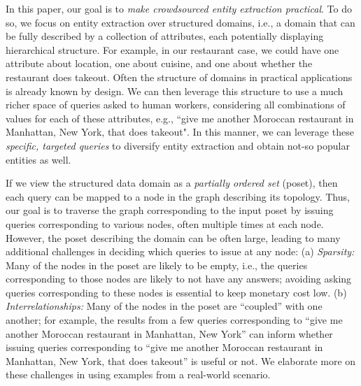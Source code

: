 In this paper, our goal is to {\em make crowdsourced entity extraction practical}. To do so, we focus on entity extraction over structured domains, i.e., a domain that can be fully described by a collection of attributes, each potentially displaying hierarchical structure. For example, in our restaurant case, we could have one attribute about location, one about cuisine, and one about whether the restaurant does takeout. Often the structure of domains in practical applications is already known by design. We can then leverage this structure to use a much richer space of queries asked to human workers, considering all combinations of values for each of these attributes, e.g., ``give me another Moroccan restaurant in Manhattan, New York, that does takeout".  In this manner, we can leverage these {\em specific, targeted queries} to diversify entity extraction and obtain not-so popular entities as well.

If we view the structured data domain as a \emph{partially ordered set} (poset), then each query can be mapped to a node in the graph describing its topology. Thus, our goal is to traverse the graph corresponding to the input poset by issuing queries corresponding to various nodes, often multiple times at each node. However, the poset describing the domain can be often large, leading to many additional challenges in deciding which queries to issue at any node: (a) {\em Sparsity:} Many of the nodes in the poset are likely to be empty, i.e., the queries corresponding to those nodes are likely to not have any answers; avoiding asking queries corresponding to these nodes is essential to keep monetary cost low. (b) {\em Interrelationships:} Many of the nodes in the poset are ``coupled'' with one another; for example, the results from a few queries corresponding to ``give me another Moroccan restaurant in Manhattan, New York'' can inform whether issuing queries corresponding to ``give me another Moroccan restaurant in Manhattan, New York, that does takeout'' is useful or not. We elaborate more on these challenges in  using examples from a real-world scenario.

